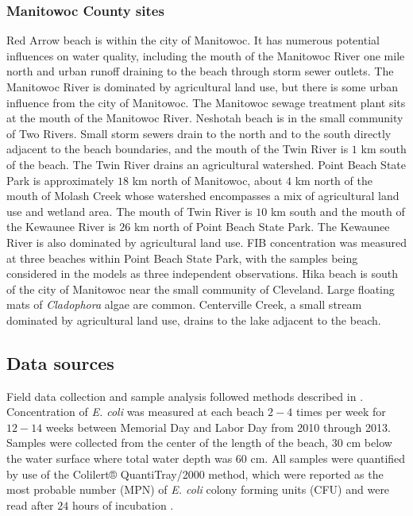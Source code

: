 \documentclass[authoryear,review, 12pt]{elsarticle}
\begin{document}
\subsubsection{Manitowoc County sites}\label{manitowoc-county-sites}

Red Arrow beach is within the city of Manitowoc. It has numerous
potential influences on water quality, including the mouth of the
Manitowoc River one mile north and urban runoff draining to the beach
through storm sewer outlets. The Manitowoc River is dominated by
agricultural land use, but there is some urban influence from the city
of Manitowoc. The Manitowoc sewage treatment plant sits at the mouth of
the Manitowoc River. Neshotah beach is in the small community of Two
Rivers. Small storm sewers drain to the north and to the south directly
adjacent to the beach boundaries, and the mouth of the Twin River is
\(1\) km south of the beach. The Twin River drains an agricultural
watershed. Point Beach State Park is approximately \(18\) km north of
Manitowoc, about \(4\) km north of the mouth of Molash Creek whose
watershed encompasses a mix of agricultural land use and wetland area.
The mouth of Twin River is \(10\) km south and the mouth of the Kewaunee
River is \(26\) km north of Point Beach State Park. The Kewaunee River
is also dominated by agricultural land use. FIB concentration was
measured at three beaches within Point Beach State Park, with the
samples being considered in the models as three independent
observations. Hika beach is south of the city of Manitowoc near the
small community of Cleveland. Large floating mats of \emph{Cladophora}
algae are common. Centerville Creek, a small stream dominated by
agricultural land use, drains to the lake adjacent to the beach.

\subsection{Data sources}\label{data-sources}

Field data collection and sample analysis followed methods described in
\cite{Francy-et-al-2013}. Concentration of \emph{E. coli} was measured at each
beach \(2-4\) times per week for \(12-14\) weeks between Memorial Day
and Labor Day from 2010 through 2013. Samples were collected from the
center of the length of the beach, \(30\) cm below the water surface
where total water depth was \(60\) cm. All samples were quantified by
use of the Colilert® QuantiTray/2000 method, which were reported as the
most probable number (MPN) of \emph{E. coli} colony forming units (CFU)
and were read after \(24\) hours of incubation \citep{Colilert}.
\end{document}
